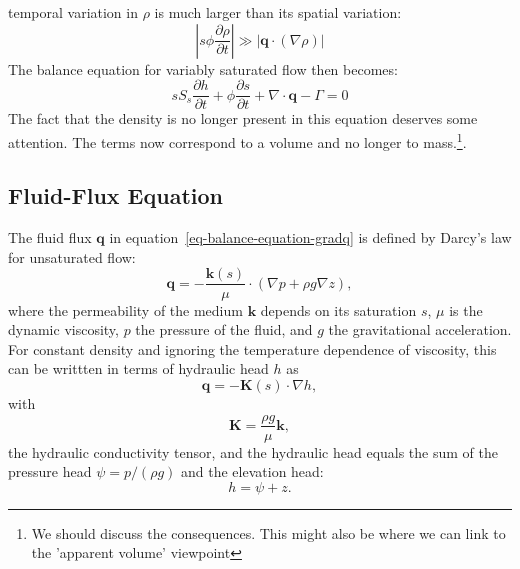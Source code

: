 \documentclass[fleqn]{article}
\begin{document}
temporal variation in $\rho$ is much larger than its spatial variation:
\begin{equation}
  \left| s \phi \frac{\partial \rho}{\partial t} \right| \gg
  \left| \mathbf{q} \cdot (\nabla \rho) \right|
  \label{eq-density-assumption}
\end{equation}
The balance equation for variably saturated flow then becomes:
\begin{equation}
  s S_s \frac{\partial h}{\partial t} +
  \phi \frac{\partial s}{\partial t} +
  \nabla \cdot \mathbf{q} -
  \Gamma = 0
  \label{eq-balance-equation-gradq}
\end{equation}
The fact that the density is no longer present in this
equation deserves some attention. The terms now correspond to
a volume and no longer to mass.\footnote{We should discuss the
consequences. This might also be where we can link to the
'apparent volume' viewpoint}.

\subsection{Fluid-Flux Equation}
The fluid flux $\mathbf{q}$ in equation~\ref{eq-balance-equation-gradq}
is defined by Darcy's law for unsaturated flow:
\begin{equation}
  \mathbf{q} = - \frac{\mathbf{k}(s)}{\mu} \cdot ( \nabla p + \rho g \nabla z ),
\end{equation}
where the permeability of the medium $\mathbf{k}$ depends on its saturation $s$,
$\mu$ is the dynamic viscosity, $p$ the pressure of the fluid, and $g$ the
gravitational acceleration. For constant density and ignoring the temperature
dependence of viscosity, this can be writtten in terms of hydraulic head
$h$ as
\begin{equation}
  \mathbf{q} = - \mathbf{K}(s) \cdot \nabla h,
  \label{eq-unsat-darcy-flux}
\end{equation}
with
\begin{equation}
  \mathbf{K} = \frac{\rho g}{\mu} \mathbf{k},
  \label{eq-hydr-cond}
\end{equation}
the hydraulic conductivity tensor, and the hydraulic head equals the 
sum of the pressure head $\psi = p/(\rho g)$ and the elevation head:
\begin{equation}
  h = \psi + z.
\end{equation}
\end{document}
